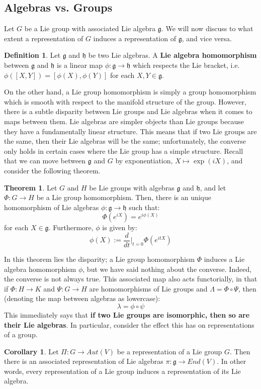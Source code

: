 \documentclass[11pt, oneside]{article}   	%
\theoremstyle{definition}
\newtheorem{definition}{Definition}[section]
\newtheorem{theorem}{Theorem}[section]
\newtheorem{corollary}{Corollary}[theorem]
\begin{document}
\subsection{Algebras vs. Groups}
Let $G$ be a Lie group with associated Lie algebra $\mathfrak g$. We will now discuss to what extent a representation 
of $G$ induces a representation of $\mathfrak g$, and vice versa. 
\begin{definition}
	Let $\mathfrak g$ and $\mathfrak h$ be two Lie algebras. A \textbf{Lie algebra homomorphism} between $\mathfrak g$ 
	and $\mathfrak h$ is a linear map $\phi : \mathfrak g\rightarrow\mathfrak h$ which respects the Lie bracket, i.e. 
	$\phi([X, Y]) = [\phi(X), \phi(Y)]$ for each $X, Y\in\mathfrak g$. 
\end{definition}
On the other hand, a Lie group homomorphism is simply a group homomorphism which is smooth with respect to 
the manifold structure of the group. However, there is a subtle disparity between Lie groups and Lie algebras when 
it comes to maps between them. Lie algebras are simpler objects than Lie groups because they have a fundamentally 
linear structure. This means that if two Lie groups are the same, then their Lie algebras will be the same; unfortunately, 
the converse only holds in certain cases where the Lie group has a simple structure. Recall that we can move between 
$\mathfrak g$ and $G$ by exponentiation, $X\mapsto \exp(iX)$, and consider the following theorem.
\begin{theorem}
	Let $G$ and $H$ be Lie groups with algebras $\mathfrak g$ and $\mathfrak h$, and let $\Phi : G\rightarrow H$ be a 
	Lie group homomorphism. Then, there is an unique homomorphism of Lie algebras $\phi : \mathfrak g\rightarrow\mathfrak 
	h$ such that:
	\begin{equation}
		\Phi(e^{iX}) = e^{i\phi(X)}
	\end{equation}
	for each $X\in\mathfrak g$. Furthermore, $\phi$ is given by:
	\begin{equation}
		\phi(X) := \frac{d}{dt}\bigg|_{t = 0}\Phi(e^{itX})
	\end{equation}
\end{theorem}
In this theorem lies the disparity; a Lie group homomorphism $\Phi$ induces a Lie algebra homomorphism $\phi$, 
but we have said nothing about the converse. Indeed, the converse is not always true. This associated map also 
acts functorially, in that if $\Phi : H\rightarrow K$ and $\Psi : G\rightarrow H$ are homomorphisms of Lie groups and 
$\Lambda = \Phi\circ\Psi$, then (denoting the map between algebras as lowercase):
\begin{equation}
	\lambda = \phi\circ\psi
\end{equation}
This immediately says that \textbf{if two Lie groups are isomorphic, then so are their Lie algebras}. In particular, 
consider the effect this has on representations of a group.
\begin{corollary}
	Let $\Pi : G\rightarrow Aut(V)$ be a representation of a Lie group $G$. Then there is an associated 
	representation of Lie algebras $\pi : \mathfrak g\rightarrow End(V)$. In other words, every representation 
	of a Lie group induces a representation of its Lie algebra.
\end{corollary}
\end{document}

